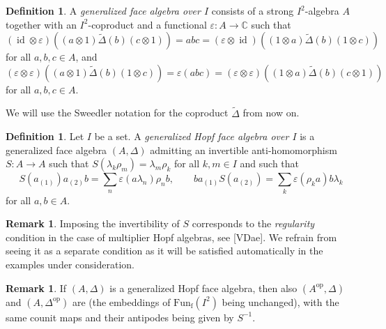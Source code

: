 \documentclass[12pt]{article}
\theoremstyle{change}
\DeclareMathOperator{\id}{id}
\DeclareMathOperator{\op}{\mathrm{op}}
\DeclareMathOperator{\fin}{\mathrm{f}}
\newcommand{\C}{\mathbb{C}}
\newcommand{\Gr}[5]{\;{}^{\;#2}_{#4}#1_{#5}^{#3}}%
\newcommand{\Fun}{\mathrm{Fun}}
\newcommand{\Ff}{\Fun_{\fin}}
\newcommand{\wDelta}{\widetilde{\Delta}}
\newtheorem{Lem}[Theorem]{Lemma}
\theoremstyle{definition}
\newtheorem{Def}[Theorem]{Definition}
\newtheorem{Rem}[Theorem]{Remark}
\numberwithin{equation}{section}
\begin{document}
\begin{Def} A \emph{generalized face algebra over $I$} consists of a strong $I^2$-algebra $A$ together with an $I^2$-coproduct and a functional $\varepsilon:A\rightarrow \C$ such that \[(\id\otimes \varepsilon)((a\otimes 1)\wDelta(b)(c\otimes 1)) = abc = (\varepsilon\otimes \id)((1\otimes a)\wDelta(b)(1\otimes c))\] for all $a,b,c\in A$, and \begin{equation}\label{EqBoh}(\varepsilon\otimes \varepsilon)((a\otimes 1)\wDelta(b)(1\otimes c)) = \varepsilon(abc) = (\varepsilon\otimes \varepsilon)((1\otimes a)\wDelta(b)(c\otimes 1))\end{equation} for all $a,b,c\in A$.%
\end{Def}






We will use the Sweedler notation for the coproduct $\wDelta$ from now on.

\begin{Def} Let $I$ be a set. A \emph{generalized Hopf face algebra over $I$} is a generalized face algebra $(A,\Delta)$ admitting an invertible anti-homomorphism $S:A \rightarrow A$ such that $S(\lambda_k\rho_m) = \lambda_m\rho_k$ for all $k,m\in I$ and such that \[S(a_{(1)})a_{(2)}b = \sum_n\varepsilon(a\lambda_n)\rho_nb, \qquad ba_{(1)}S(a_{(2)}) = \sum_k\varepsilon(\rho_ka)b\lambda_k\] for all $a,b\in A$.
\end{Def}

\begin{Rem} Imposing the invertibility of $S$ corresponds to the \emph{regularity} condition in the case of multiplier Hopf algebras, see [VDae]. We refrain from seeing it as a separate condition as it will be satisfied automatically in the examples under consideration.
\end{Rem}

\begin{Rem} If $(A,\Delta)$ is a generalized Hopf face algebra, then also $(A^{\op},\Delta)$ and $(A,\Delta^{\op})$ are (the embeddings of $\Ff(I^2)$ being unchanged), with the same counit maps and their antipodes being given by $S^{-1}$.

\end{Rem}
\end{document}
